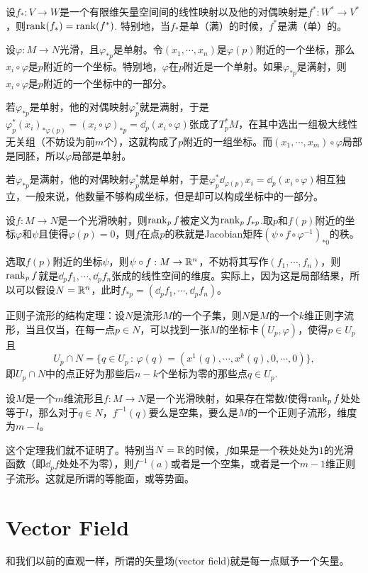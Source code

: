 \lem 设$f_*:V\to W$是一个有限维矢量空间间的线性映射以及他的对偶映射是$f^*:W^*\to V^*$，则$\operatorname{rank}(f_*)=\operatorname{rank}(f^*)$. 特别地，当$f_*$是单（满）的时候，$f^*$是满（单）的。

\para 设$\varphi:M\to N$光滑，且$\varphi_{*p}$是单射。令$(x_1,\cdots,x_n)$是$\varphi(p)$附近的一个坐标，那么$x_i\circ\varphi$是$p$附近的一个坐标。特别地，$\varphi$在$p$附近是一个单射。如果$\varphi_{*p}$是满射，则$x_i\circ\varphi$是$p$附近的一个坐标中的一部分。

若$\varphi_{*p}$是单射，他的对偶映射$\varphi^*_p$就是满射，于是$\varphi^*_p(x_i)_{*\varphi(p)}=(x_i\circ\varphi)_{*p}=\dd_p(x_i\circ \varphi)$张成了$T_p^*M$，在其中选出一组极大线性无关组（不妨设为前$m$个），这就构成了$p$附近的一组坐标。而$(x_1,\cdots,x_m)\circ \varphi$局部是同胚，所以$\varphi$局部是单射。

若$\varphi_{*p}$是满射，他的对偶映射$\varphi^*_p$就是单射，于是$\varphi^*_p\dd_{\varphi(p)}x_i=\dd_p(x_i\circ \varphi)$相互独立，一般来说，他数量不够构成坐标，但是却可以构成坐标中的一部分。

\para 设$f:M\to N$是一个光滑映射，则$\operatorname{rank}_p f$被定义为$\operatorname{rank}_p f_{*p}$.取$p$和$f(p)$附近的坐标$\varphi$和$\psi$且使得$\varphi(p)=0$，则$f$在点$p$的秩就是Jacobian矩阵$(\psi\circ f \circ \varphi^{-1})_{*0}$的秩。

选取$f(p)$附近的坐标$\psi$，则$\psi\circ f:M\to \mathbb{R}^n$，不妨将其写作$(f_1,\cdots,f_n)$，则$\operatorname{rank}_p f$就是${\dd_pf_1,\cdots,\dd_pf_n}$张成的线性空间的维度。实际上，因为这是局部结果，所以可以假设$N=\mathbb{R}^n$，此时$f_{*p}=(\dd_pf_1,\cdots,\dd_pf_n)$。

\theo 正则子流形的结构定理：设$N$是流形$M$的一个子集，则$N$是$M$的一个$k$维正则字流形，当且仅当，在每一点$p\in N$，可以找到一张$M$的坐标卡$(U_p,\varphi)$，使得$p\in U_p$且
\[
	U_p\cap N=\bigl\{q\in U_p\,:\,\varphi(q)=\left(x^1(q),\cdots,x^k(q),0,\cdots,0\right)\bigr\},
\]
即$U_p\cap N$中的点正好为那些后$n-k$个坐标为零的那些点$q\in U_p$.

\theo \label{ranktheo}设$M$是一个$m$维流形且$f:M\to N$是一个光滑映射，如果存在常数$l$使得$\operatorname{rank}_p f$处处等于$l$，那么对于$q\in N$，$f^{-1}(q)$要么是空集，要么是$M$的一个正则子流形，维度为$m-l$。

这个定理我们就不证明了。特别当$N=\mathbb{R}$的时候，$f$如果是一个秩处处为$1$的光滑函数（即$\dd_p f$处处不为零），则$f^{-1}(a)$或者是一个空集，或者是一个$m-1$维正则子流形。这就是所谓的等能面，或等势面。

\section{Vector Field}
和我们以前的直观一样，所谓的矢量场(vector field)就是每一点赋予一个矢量。

